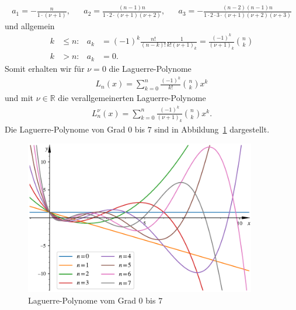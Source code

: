 \begin{align*}
a_1
=
-\frac{n}{1 \cdot (\nu + 1)}
, &  &
a_2
=
\frac{(n-1)n}{1 \cdot 2 \cdot (\nu + 1)(\nu + 2)}
, &  &
a_3
=
-\frac{(n-2)(n-1)n}{1 \cdot 2 \cdot 3 \cdot (\nu + 1)(\nu + 2)(\nu + 3)}
\end{align*}
und allgemein
\begin{align*}
k
  & \leq
n:
  &
a_k
  & =
(-1)^k \frac{n!}{(n-k)!} \frac{1}{k!(\nu + 1)_k}
=
\frac{(-1)^k}{(\nu + 1)_k} \binom{n}{k}
\\
k & >n:
  &
a_k
  & =
0.
\end{align*}
Somit erhalten wir für $\nu = 0$ die Laguerre-Polynome
\begin{align}
L_n(x)
=
\sum_{k=0}^{n} \frac{(-1)^k}{k!} \binom{n}{k} x^k
\label{laguerre:polynom}
\end{align}
und mit $\nu \in \mathbb{R}$ die verallgemeinerten Laguerre-Polynome
\begin{align}
L_n^\nu(x)
=
\sum_{k=0}^{n} \frac{(-1)^k}{(\nu + 1)_k} \binom{n}{k} x^k.
\label{laguerre:allg_polynom}
\end{align}
Die Laguerre-Polynome von Grad $0$ bis $7$ sind in
Abbildung~\ref{laguerre:fig:polyeval} dargestellt.
\begin{figure}
\centering
\includegraphics[width=0.9\textwidth]{papers/laguerre/images/laguerre_poly.pdf}
\caption{Laguerre-Polynome vom Grad $0$ bis $7$}
\label{laguerre:fig:polyeval}
\end{figure}

